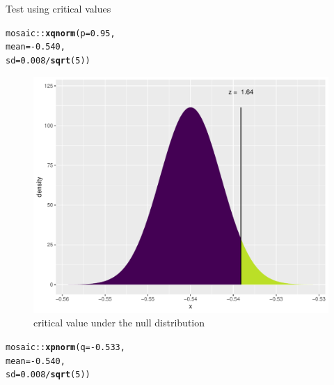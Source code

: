 \documentclass[10pt]{beamer}\usepackage[]{graphicx}\usepackage[]{color}
\makeatletter
\def\maxwidth{ %
  \ifdim\Gin@nat@width>\linewidth
    \linewidth
  \else
    \Gin@nat@width
  \fi
}
\newcommand{\hlnum}[1]{\textcolor[rgb]{0.686,0.059,0.569}{#1}}%
\newcommand{\hlopt}[1]{\textcolor[rgb]{0,0,0}{#1}}%
\newcommand{\hlstd}[1]{\textcolor[rgb]{0.345,0.345,0.345}{#1}}%
\newcommand{\hlkwc}[1]{\textcolor[rgb]{0.333,0.667,0.333}{#1}}%
\newcommand{\hlkwd}[1]{\textcolor[rgb]{0.737,0.353,0.396}{\textbf{#1}}}%
\newenvironment{kframe}{%
 \def\at@end@of@kframe{}%
 \ifinner\ifhmode%
  \def\at@end@of@kframe{\end{minipage}}%
  \begin{minipage}{\columnwidth}%
 \fi\fi%
 \def\FrameCommand##1{\hskip\@totalleftmargin \hskip-\fboxsep
 \colorbox{shadecolor}{##1}\hskip-\fboxsep
     \hskip-\linewidth \hskip-\@totalleftmargin \hskip\columnwidth}%
 \MakeFramed {\advance\hsize-\width
   \@totalleftmargin\z@ \linewidth\hsize
   \@setminipage}}%
 {\par\unskip\endMakeFramed%
 \at@end@of@kframe}
\newenvironment{knitrout}{}{} %
\makeatother
\begin{document}
\begin{frame}[fragile]{Test using critical values}
	
	
	\begin{minipage}{0.47\textwidth}
\begin{knitrout}\tiny
{}\color{fgcolor}\begin{kframe}
\begin{alltt}
\hlstd{mosaic}\hlopt{::}\hlkwd{xqnorm}\hlstd{(}\hlkwc{p} \hlstd{=} \hlnum{0.95}\hlstd{,}
\hlkwc{mean} \hlstd{=} \hlopt{-}\hlnum{0.540}\hlstd{,}
\hlkwc{sd} \hlstd{=} \hlnum{0.008}\hlopt{/}\hlkwd{sqrt}\hlstd{(}\hlnum{5}\hlstd{))}
\end{alltt}
\end{kframe}\begin{figure}

{\centering \includegraphics[width=\maxwidth]{figure/unnamed-chunk-4-1} 

}

\caption[critical value under the null distribution]{critical value under the null distribution}\label{fig:unnamed-chunk-4}
\end{figure}


\end{knitrout}
	\end{minipage}
	\begin{minipage}{0.47\textwidth}
\begin{knitrout}\tiny
{}\color{fgcolor}\begin{kframe}
\begin{alltt}
\hlstd{mosaic}\hlopt{::}\hlkwd{xpnorm}\hlstd{(}\hlkwc{q} \hlstd{=} \hlopt{-}\hlnum{0.533}\hlstd{,}
\hlkwc{mean} \hlstd{=} \hlopt{-}\hlnum{0.540}\hlstd{,}
\hlkwc{sd} \hlstd{=} \hlnum{0.008}\hlopt{/}\hlkwd{sqrt}\hlstd{(}\hlnum{5}\hlstd{))}
\end{alltt}
\end{kframe}\begin{figure}


\end{figure}
\end{knitrout}
\end{minipage}
\end{frame}
\end{document}
